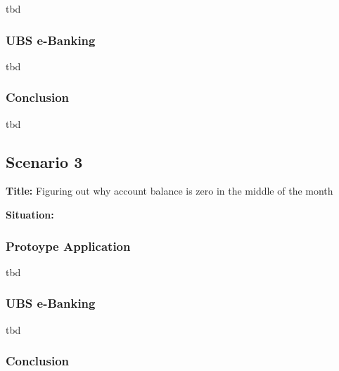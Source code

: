tbd



\subsubsection{UBS e-Banking}

tbd


\subsubsection{Conclusion}

tbd





\subsection{Scenario 3}

\textbf{Title:} Figuring out why  account balance is zero in the middle of the month

\textbf{Situation:}


\subsubsection{Protoype Application}

tbd



\subsubsection{UBS e-Banking}

tbd


\subsubsection{Conclusion}

